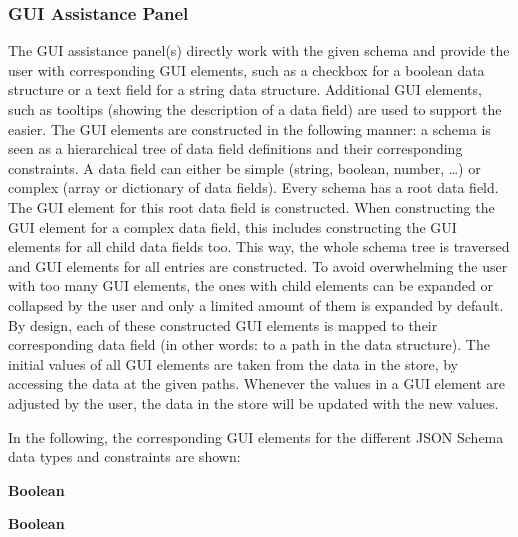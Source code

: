 
\subsubsection{GUI Assistance Panel}
The GUI assistance panel(s) directly work with the given schema and provide the user with corresponding GUI elements, such as a checkbox for a boolean data structure or a text field for a string data structure.
Additional GUI elements, such as tooltips (showing the description of a data field) are used to support the easier.
The GUI elements are constructed in the following manner: a schema is seen as a hierarchical tree of data field definitions and their corresponding constraints.
A data field can either be simple (string, boolean, number, \ldots) or complex (array or dictionary of data fields).
Every schema has a root data field.
The GUI element for this root data field is constructed. %
When constructing the GUI element for a complex data field, this includes constructing the GUI elements for all child data fields too.
This way, the whole schema tree is traversed and GUI elements for all entries are constructed.
To avoid overwhelming the user with too many GUI elements, the ones with child elements can be expanded or collapsed by the user and only a limited amount of them is expanded by default.
By design, each of these constructed GUI elements is mapped to their corresponding data field (in other words: to a path in the data structure).
The initial values of all GUI elements are taken from the data in the store, by accessing the data at the given paths.
Whenever the values in a GUI element are adjusted by the user, the data in the store will be updated with the new values.

In the following, the corresponding GUI elements for the different JSON Schema data types and constraints are shown:

\textbf{Boolean}


\textbf{Boolean}

